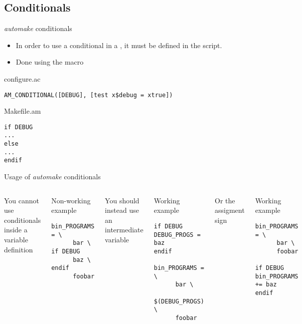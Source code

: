 \subsection{Conditionals}

\begin{frame}[fragile]{{\em automake} conditionals}

  \begin{itemize}
  \item In order to use a conditional in a , it must
    be defined in the  script.
  \item Done using the 
    macro
  \end{itemize}

  \begin{block}{configure.ac}
\begin{verbatim}
AM_CONDITIONAL([DEBUG], [test x$debug = xtrue])
\end{verbatim}
  \end{block}

  \begin{block}{Makefile.am}
\begin{verbatim}
if DEBUG
...
else
...
endif
\end{verbatim}
  \end{block}

\end{frame}

\begin{frame}[fragile]{Usage of {\em automake} conditionals}

  \begin{columns}
    You cannot use conditionals inside a variable definition
    \begin{block}{Non-working example}
\begin{verbatim}
bin_PROGRAMS = \
      bar \
if DEBUG
      baz \
endif
      foobar
\end{verbatim}
\end{block}

    You should instead use an intermediate variable

    \begin{block}{Working example}
\begin{verbatim}
if DEBUG
DEBUG_PROGS = baz
endif

bin_PROGRAMS = \
      bar \
      $(DEBUG_PROGS) \
      foobar
\end{verbatim}
\end{block}

    Or the \code{+=} assigment sign

    \begin{block}{Working example}
\begin{verbatim}
bin_PROGRAMS = \
      bar \
      foobar

if DEBUG
bin_PROGRAMS += baz
endif
\end{verbatim}
\end{block}
\end{columns}
\end{frame}


